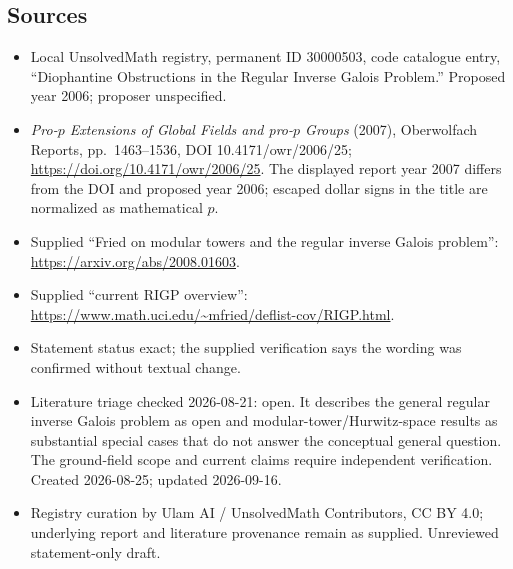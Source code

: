 \documentclass[11pt]{article}
\begin{document}
\subsection{Sources}
\begin{itemize}
\item Local UnsolvedMath registry, permanent ID 30000503, code catalogue entry, ``Diophantine Obstructions in the Regular Inverse Galois Problem.'' Proposed year 2006; proposer unspecified.
\item \emph{Pro-$p$ Extensions of Global Fields and pro-$p$ Groups} (2007), Oberwolfach Reports, pp.\ 1463--1536, DOI 10.4171/owr/2006/25; \url{https://doi.org/10.4171/owr/2006/25}. The displayed report year 2007 differs from the DOI and proposed year 2006; escaped dollar signs in the title are normalized as mathematical $p$.
\item Supplied ``Fried on modular towers and the regular inverse Galois problem'': \url{https://arxiv.org/abs/2008.01603}.
\item Supplied ``current RIGP overview'': \url{https://www.math.uci.edu/~mfried/deflist-cov/RIGP.html}.
\item Statement status exact; the supplied verification says the wording was confirmed without textual change.
\item Literature triage checked 2026-08-21: open. It describes the general regular inverse Galois problem as open and modular-tower/Hurwitz-space results as substantial special cases that do not answer the conceptual general question. The ground-field scope and current claims require independent verification. Created 2026-08-25; updated 2026-09-16.
\item Registry curation by Ulam AI / UnsolvedMath Contributors, CC BY 4.0; underlying report and literature provenance remain as supplied. Unreviewed statement-only draft.
\end{itemize}
\end{document}
